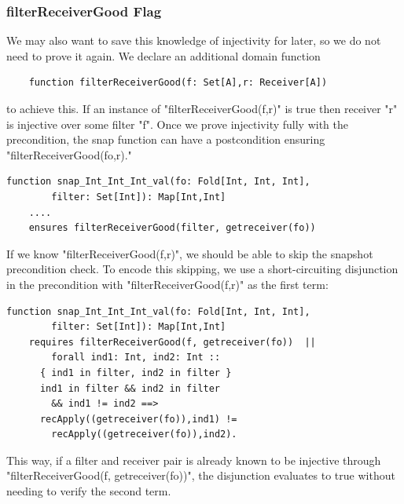 \documentclass[msc,oneside]{ubcthesis}
\theoremstyle{definition}
\begin{document}
\subsubsection{filterReceiverGood Flag}
We may also want to save this knowledge of injectivity for later, so we do not need to prove it again. We declare an additional domain function 
\begin{lstlisting}
    function filterReceiverGood(f: Set[A],r: Receiver[A])
\end{lstlisting}
to achieve this. If an instance of "filterReceiverGood(f,r)" is true then receiver "r" is injective over some filter "f". Once we prove injectivity fully with the precondition, the snap function can have a postcondition ensuring "filterReceiverGood(fo,r)."
\begin{lstlisting}
function snap_Int_Int_Int_val(fo: Fold[Int, Int, Int], 
        filter: Set[Int]): Map[Int,Int]
    ....
    ensures filterReceiverGood(filter, getreceiver(fo))
\end{lstlisting}

If we know "filterReceiverGood(f,r)", we should be able to skip the snapshot precondition check. To encode this skipping, we use a short-circuiting disjunction in the precondition with "filterReceiverGood(f,r)" as the first term:
\begin{lstlisting}
function snap_Int_Int_Int_val(fo: Fold[Int, Int, Int], 
        filter: Set[Int]): Map[Int,Int]
    requires filterReceiverGood(f, getreceiver(fo))  ||     
        forall ind1: Int, ind2: Int ::
      { ind1 in filter, ind2 in filter }
      ind1 in filter && ind2 in filter 
        && ind1 != ind2 ==>
      recApply((getreceiver(fo)),ind1) !=
        recApply((getreceiver(fo)),ind2).
\end{lstlisting}
This way, if a filter and receiver pair is already known to be injective through "filterReceiverGood(f, getreceiver(fo))", the disjunction evaluates to true without needing to verify the second term.
\end{document}
